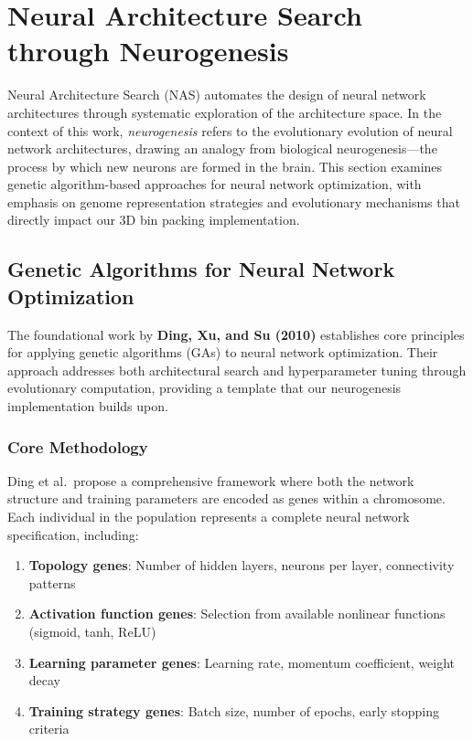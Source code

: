 \section{Neural Architecture Search through Neurogenesis}
\label{sec:neurogenesis}

Neural Architecture Search (NAS) automates the design of neural network architectures through systematic exploration of the architecture space. In the context of this work, \emph{neurogenesis} refers to the evolutionary evolution of neural network architectures, drawing an analogy from biological neurogenesis—the process by which new neurons are formed in the brain. This section examines genetic algorithm-based approaches for neural network optimization, with emphasis on genome representation strategies and evolutionary mechanisms that directly impact our 3D bin packing implementation.

\subsection{Genetic Algorithms for Neural Network Optimization}
\label{subsec:ga_fundamentals}

The foundational work by \textbf{Ding, Xu, and Su (2010)} \cite{Ding2010} establishes core principles for applying genetic algorithms (GAs) to neural network optimization. Their approach addresses both architectural search and hyperparameter tuning through evolutionary computation, providing a template that our neurogenesis implementation builds upon.

\subsubsection{Core Methodology}

Ding et al.\ propose a comprehensive framework where both the network structure and training parameters are encoded as genes within a chromosome. Each individual in the population represents a complete neural network specification, including:

\begin{enumerate}
    \item \textbf{Topology genes}: Number of hidden layers, neurons per layer, connectivity patterns
    \item \textbf{Activation function genes}: Selection from available nonlinear functions (sigmoid, tanh, ReLU)
    \item \textbf{Learning parameter genes}: Learning rate, momentum coefficient, weight decay
    \item \textbf{Training strategy genes}: Batch size, number of epochs, early stopping criteria
\end{enumerate}

